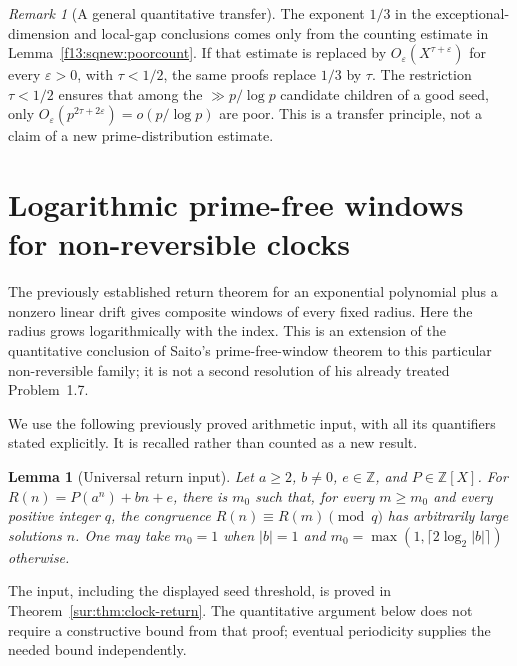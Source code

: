 \documentclass[11pt,a4paper]{article}
\newtheorem{lemma}[theorem]{Lemma}
\theoremstyle{definition}
\theoremstyle{remark}
\newtheorem{remark}[theorem]{Remark}
\numberwithin{equation}{section}
\begin{document}
\begin{remark}[A general quantitative transfer]
The exponent $1/3$ in the exceptional-dimension and local-gap conclusions
comes only from the counting estimate in Lemma~\ref{f13:sqnew:poorcount}.
If that estimate is replaced by $O_\varepsilon(X^{\tau+\varepsilon})$
for every $\varepsilon>0$, with $\tau<1/2$, the same proofs replace
$1/3$ by $\tau$. The restriction $\tau<1/2$ ensures that among the
$\gg p/\log p$ candidate children of a good seed, only
$O_\varepsilon(p^{2\tau+2\varepsilon})=o(p/\log p)$ are poor.
This is a transfer principle, not a claim of a new prime-distribution
estimate.
\end{remark}


\section{Logarithmic prime-free windows for non-reversible clocks}
\label{f13:sec:nonrev-log-windows}

The previously established return theorem for an exponential polynomial
plus a nonzero linear drift gives composite windows of every fixed
radius.  Here the radius grows logarithmically with the index.  This is
an extension of the quantitative conclusion of Saito's prime-free-window
theorem to this particular non-reversible family; it is not a second
resolution of his already treated Problem~1.7.

We use the following previously proved arithmetic input, with all its
quantifiers stated explicitly.  It is recalled rather than counted as
a new result.
\begin{lemma}[Universal return input]\label{f13:lem:window-return-input}
Let $a\ge2$, $b\ne0$, $e\in\mathbb Z$, and $P\in\mathbb Z[X]$.
For $R(n)=P(a^n)+bn+e$, there is $m_0$ such that, for every $m\ge m_0$
and every positive integer $q$, the congruence
$R(n)\equiv R(m)\pmod q$ has arbitrarily large solutions $n$.
One may take $m_0=1$ when $|b|=1$ and
$m_0=\max(1,\lceil2\log_2|b|\rceil)$ otherwise.
\end{lemma}
The input, including the displayed seed threshold, is proved in
Theorem~\ref{sur:thm:clock-return}. The quantitative argument below
does not require a constructive bound from that proof; eventual
periodicity supplies the needed bound independently.
\end{document}
